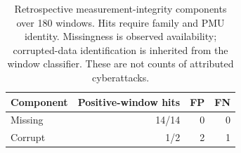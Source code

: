 \begin{table}[t]\centering\small
\caption{Retrospective measurement-integrity components over 180 windows. Hits require family and PMU identity. Missingness is observed availability; corrupted-data identification is inherited from the window classifier. These are not counts of attributed cyberattacks.}
\label{tab:review_integrity}
\begin{tabular}{lrrr}\toprule
Component & Positive-window hits & FP & FN\\\midrule
Missing & 14/14 & 0 & 0\\
Corrupt & 1/2 & 2 & 1\\
\bottomrule\end{tabular}
\end{table}
